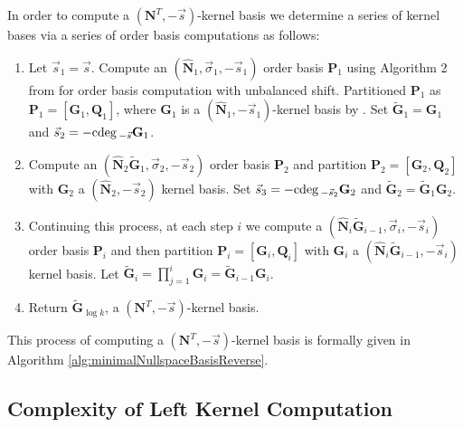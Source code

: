 In order to compute a $\left(\mathbf{N}^{T},-\vec{s}\right)$-kernel
basis we determine a series of kernel bases via a series of order
basis computations as follows:
\begin{enumerate}
\item Let $\vec{s}_{1}=\vec{s}$. Compute an $\left(\hat{\mathbf{N}}_{1},\vec{\sigma}_{1},-\vec{s}_{1}\right)$
order basis $\mathbf{P}_{1}$ using Algorithm 2 from \cite{za2009}
for order basis computation with unbalanced shift. Partitioned $\mathbf{P}_{1}$
as $\mathbf{P}_{1}=\left[\mathbf{G}_{1},\mathbf{Q}_{1}\right]$, where
$\mathbf{G}_{1}$ is a $\left(\hat{\mathbf{N}}_{1},-\vec{s}_{1}\right)$-kernel
basis by .
Set $\tilde{\mathbf{G}}_{1}=\mathbf{G}_{1}$ and $\vec{s}_{2}=-{\rm cdeg}\,_{-\vec{s}}\mathbf{G}_{1}$. 
\item Compute an $\left(\hat{\mathbf{N}}_{2}\tilde{\mathbf{G}}_{1},\vec{\sigma}_{2},-\vec{s}_{2}\right)$
order basis $\mathbf{P}_{2}$ and partition $\mathbf{P}_{2}=\left[\mathbf{G}_{2},\mathbf{Q}_{2}\right]$
with $\mathbf{G}_{2}$ a $\left(\hat{\mathbf{N}}_{2},-\vec{s}_{2}\right)$
kernel basis. Set $\vec{s}_{3}=-{\rm cdeg}\,_{-\vec{s}_{2}}\mathbf{G}_{2}$
and $\tilde{\mathbf{G}}_{2}=\tilde{\mathbf{G}}_{1}\mathbf{G}_{2}$.
\item Continuing this process, at each step $i$ we compute a $\left(\hat{\mathbf{N}}_{i}\tilde{\mathbf{G}}_{i-1},\vec{\sigma}_{i},-\vec{s}_{i}\right)$
order basis $\mathbf{P}_{i}$ and then partition $\mathbf{P}_{i}=\left[\mathbf{G}_{i},\mathbf{Q}_{i}\right]$
with $\mathbf{G}_{i}$ a $\left(\hat{\mathbf{N}}_{i}\tilde{\mathbf{G}}_{i-1},-\vec{s}_{i}\right)$
kernel basis. Let $\tilde{\mathbf{G}}_{i}=\prod_{j=1}^{i}\mathbf{G}_{i}=\tilde{\mathbf{G}}_{i-1}\mathbf{G}_{i}$. 
\item Return $\tilde{\mathbf{G}}_{\log k}$, a $\left(\mathbf{N}^{T},-\vec{s}\right)$-kernel
basis. 
\end{enumerate}
This process of computing a $\left(\mathbf{N}^{T},-\vec{s}\right)$-kernel
basis is formally given in Algorithm \ref{alg:minimalNullspaceBasisReverse}.


\subsection{Complexity of Left Kernel Computation}

